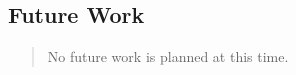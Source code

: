 \subsection*{Future Work}

\begin{quotation}
No future work is planned at this time.
\end{quotation}


%
